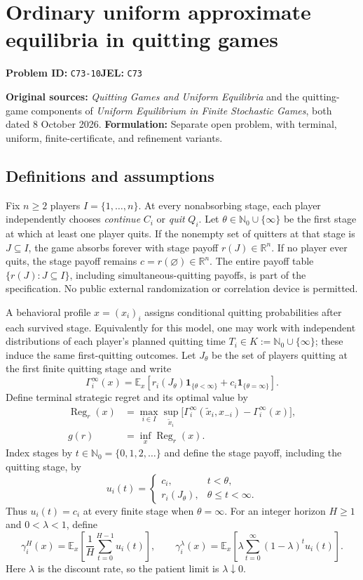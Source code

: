 \documentclass[11pt,a4paper]{article}
\newcommand{\R}{\mathbb R}
\newcommand{\E}{\mathbb E}
\begin{document}
\section*{Ordinary uniform approximate equilibria in quitting games}
\textbf{Problem ID:} \texttt{C73-10}\quad \textbf{JEL:} \texttt{C73}\par
\label{problem:OP-0591}
\label{supp:quitting-games}

\noindent\textbf{Original sources:} \emph{Quitting Games and Uniform
	Equilibria} and the quitting-game components of \emph{Uniform
	Equilibrium in Finite Stochastic Games}, both dated 8 October 2026.
\textbf{Formulation:} Separate open problem, with terminal,
uniform, finite-certificate, and refinement variants.

\subsection*{Definitions and assumptions}

Fix $n\ge2$ players $I=\{1,\ldots,n\}$. At every nonabsorbing
stage, each player independently chooses \emph{continue} $C_i$ or
\emph{quit} $Q_i$. Let $\theta\in\mathbb N_0\cup\{\infty\}$ be the
first stage at which at least one player quits. If the nonempty set of
quitters at that stage is $J\subseteq I$, the game absorbs forever with
stage payoff $r(J)\in\R^n$. If no player ever quits, the stage payoff
remains $c=r(\varnothing)\in\R^n$. The entire payoff table
$\{r(J):J\subseteq I\}$, including simultaneous-quitting payoffs, is
part of the specification. No public external randomization or
correlation device is permitted.

A behavioral profile $x=(x_i)_i$ assigns conditional quitting
probabilities after each survived stage. Equivalently for this model,
one may work with independent distributions of each player's planned
quitting time $T_i\in K:=\mathbb N_0\cup\{\infty\}$; these induce the
same first-quitting outcomes. Let $J_\theta$ be the set of players
quitting at the first finite quitting stage and write
\[
\Gamma_i^\infty(x)=\E_x\!\left[
r_i(J_\theta)\mathbf1_{\{\theta<\infty\}}
+c_i\mathbf1_{\{\theta=\infty\}}\right].
\]
Define terminal strategic regret and its optimal value by
\[
\begin{aligned}
	\operatorname{Reg}_r(x)
	&=\max_{i\in I}\sup_{\widetilde x_i}
	\bigl[\Gamma_i^\infty(\widetilde x_i,x_{-i})
	-\Gamma_i^\infty(x)\bigr],\\
	g(r)&=\inf_{x}\operatorname{Reg}_r(x).
\end{aligned}
\]
Index stages by $t\in\mathbb N_0=\{0,1,2,\ldots\}$ and define the
stage payoff, including the quitting stage, by
\[
u_i(t)=\begin{cases}
c_i,&t<\theta,\\
r_i(J_\theta),&\theta\le t<\infty.
\end{cases}
\]
Thus $u_i(t)=c_i$ at every finite stage when $\theta=\infty$.
For an integer horizon $H\ge1$ and $0<\lambda<1$, define
\[
\gamma_i^H(x)=\E_x\!\left[\frac1H\sum_{t=0}^{H-1}u_i(t)\right],
\qquad
\gamma_i^\lambda(x)=\E_x\!\left[\lambda\sum_{t=0}^{\infty}
(1-\lambda)^t u_i(t)\right].
\]
Here $\lambda$ is the discount rate, so the patient limit is
$\lambda\downarrow0$.
\end{document}
